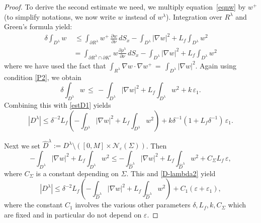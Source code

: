 \documentclass[a4paper,12pt,fullpage]{article}
\numberwithin{equation}{section}
\def\ep{\varepsilon}
\begin{document}
\begin{proof}
To derive the second estimate we need, we multiply equation~\eqref{eqnw} by $w^+$ (to simplify notations, we now write $w$ instead of $w^\lambda$). Integration over $R^\lambda$ and Green's formula yield:
\[
\begin{split}
\delta \int_{D^\lambda} w \, & \, \leq  \int_{\partial R^\lambda}w^+ \, \frac{\partial w} {\partial\nu}\,dS_x
-\int_{D^\lambda}\left|\nabla w \right|^2 +L_f\int_{D^\lambda} w^2 \\
&=\int_{\partial R^\lambda\cap\partial K^\ep}w \frac{\partial \rho^\lambda}{\partial\nu}\,dS_x-\int_{D^\lambda}\left|\nabla w \right|^2 +L_f\int_{D^\lambda} w^2 
\end{split}
\]
where we have used the fact that $\int_{R^\lambda} \nabla w \cdot \nabla w^+\, =\, \int_{D^\lambda}\left|\nabla w \right|^2$. Again using condition \eqref{P2}, we obtain
\[
\delta \int_{D^\lambda}w \,\leq \,
-\int_{D^\lambda}\left|\nabla w\right|^2 +L_f\int_{D^\lambda} w^2 + k\,\ep_1.
\]
Combining this with \eqref{estD1} yields
\begin{equation}\label{D-lambda2}
|D^\lambda|\leq \delta^{-2}L_f\left(-\int_{D^\lambda}\left|\nabla w\right|^2 +L_f\int_{D^\lambda} w^2 \right)+ k \delta^{-1} (1 +L_f \delta^{-1}) \, \ep_1.
\end{equation}

Next we set $\widehat D^\lambda:=D^\lambda\setminus\left( [0,M]\times {\mathcal N}_{\ep}(\Sigma)\right)$. Then
\[
-\int_{D^\lambda}\left|\nabla w\right|^2 +L_f\int_{D^\lambda}w^2 \leq
-\int_{\widehat{D}^\lambda}\left|\nabla w\right|^2 +L_f\int_{\widehat D^\lambda}w^2 +C_\Sigma L_f \,\ep,
\]
where $C_\Sigma$ is a constant depending on $\Sigma$. This and \eqref{D-lambda2} yield
\[
|D^\lambda|\leq \delta^{-2} L_f\left(- \int_{\widehat D^\lambda}\left|\nabla w\right|^2 + L_f\int_{\widehat D^\lambda} w^2 \right)+C_1(\ep+ \ep_1),
\]
where the constant $C_1$ involves the various other parameters $\delta, L_f, k, C_\Sigma$ which are fixed and in particular do not depend on $\ep$.


\end{proof}
\end{document}
